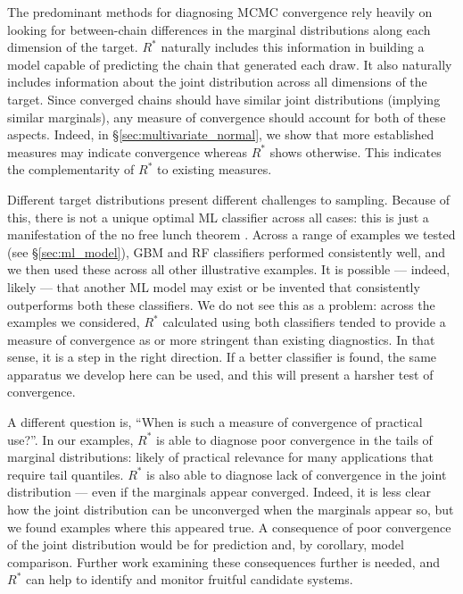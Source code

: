 \documentclass[ba]{imsart}
\numberwithin{equation}{section}
\theoremstyle{plain}
\begin{document}
The predominant methods for diagnosing MCMC convergence rely heavily on looking for between-chain differences in the marginal distributions along each dimension of the target. $R^*$ naturally includes this information in building a model capable of predicting the chain that generated each draw. It also naturally includes information about the joint distribution across all dimensions of the target. Since converged chains should have similar joint distributions (implying similar marginals), any measure of convergence should account for both of these aspects. Indeed, in \S\ref{sec:multivariate_normal}, we show that more established measures may indicate convergence whereas $R^*$ shows otherwise. This indicates the complementarity of $R^*$ to existing measures.


Different target distributions present different challenges to sampling. Because of this, there is not a unique optimal ML classifier across all cases: this is just a manifestation of the no free lunch theorem \citep{wolpert1997no}. Across a range of examples we tested (see \S\ref{sec:ml_model}), GBM and RF classifiers performed consistently well, and we then used these across all other illustrative examples. It is possible — indeed, likely — that another ML model may exist or be invented that consistently outperforms both these classifiers. We do not see this as a problem: across the examples we considered, $R^*$ calculated using both classifiers tended to provide a measure of convergence as or more stringent than existing diagnostics. In that sense, it is a step in the right direction. If a better classifier is found, the same apparatus we develop here can be used, and this will present a harsher test of convergence.

A different question is, ``When is such a measure of convergence of practical use?''. In our examples, $R^*$ is able to diagnose poor convergence in the tails of marginal distributions: likely of practical relevance for many applications that require tail quantiles. $R^*$ is also able to diagnose lack of convergence in the joint distribution — even if the marginals appear converged. Indeed, it is less clear how the joint distribution can be unconverged when the marginals appear so, but we found examples where this appeared true. A consequence of poor convergence of the joint distribution would be for prediction and, by corollary, model comparison. Further work examining these consequences further is needed, and $R^*$ can help to identify and monitor fruitful candidate systems.
\end{document}
